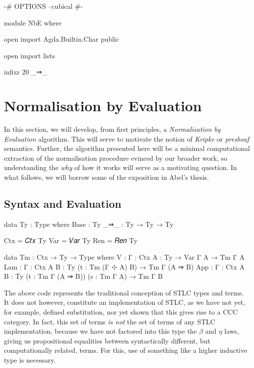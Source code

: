 \begin{code}[hide]
{-# OPTIONS --cubical #-}

module NbE where

open import Agda.Builtin.Char public

open import lists

infixr 20 _⇒_
\end{code}

\section{Normalisation by Evaluation}

In this section, we will develop, from first principles, a \emph{Normalisation
by Evaluation} algorithm. This will serve to motivate the notion of
\emph{Kripke} or \emph{presheaf} semantics. Further, the algorithm presented
here will be a minimal computational extraction of the normalisation procedure
evinced by our broader work, so understanding the \emph{why} of how it works
will serve as a motivating question. In what follows, we will borrow some of
the exposition in Abel's thesis.

\subsection{Syntax and Evaluation}

\begin{code}
data Ty : Type where
  Base : Ty
  _⇒_ : Ty → Ty → Ty

Ctx = 𝐶𝑡𝑥 Ty
Var = 𝑉𝑎𝑟 Ty
Ren = 𝑅𝑒𝑛 Ty

data Tm : Ctx → Ty → Type where
  V : {Γ : Ctx} {A : Ty} → Var Γ A → Tm Γ A
  Lam : {Γ : Ctx} {A B : Ty} (t : Tm (Γ ⊹ A) B) → Tm Γ (A ⇒ B)
  App : {Γ : Ctx} {A B : Ty} (t : Tm Γ (A ⇒ B)) (s : Tm Γ A) → Tm Γ B
\end{code}

\clearpage

The above code represents the traditional conception of STLC types and terms.
It does not however, constitute an implementation of STLC, as we have not yet,
for example, defined substitution, nor yet shown that this gives rise to a
CCC category. In fact, this set of terms \emph{is not} the set of terms of any
STLC implementation, because we have not factored into this type the $\beta$
and $\eta$ laws, giving us propositional equalities between syntactically
different, but computationally related, terms. For this, use of something like
a higher inductive type is necessary.


